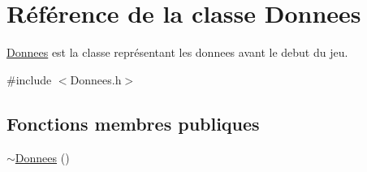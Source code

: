 \hypertarget{classDonnees}{\section{\-Référence de la classe \-Donnees}
\label{classDonnees}
}


\hyperlink{classDonnees}{\-Donnees} est la classe représentant les donnees avant le debut du jeu.  




{\ttfamily \#include $<$\-Donnees.\-h$>$}

\subsection*{\-Fonctions membres publiques}
\begin{DoxyCompactItemize}
\item 
\hypertarget{classDonnees_a32538936d4181628ec1cc7f6533436d0}{\hyperlink{classDonnees_a32538936d4181628ec1cc7f6533436d0}{$\sim$\-Donnees} ()}\label{classDonnees_a32538936d4181628ec1cc7f6533436d0}


\end{DoxyCompactItemize}
